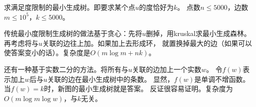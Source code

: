 \begin{prob}
	求满足度限制的最小生成树。即要求某个点$u$的度恰好为$k$。
	点数$n \le 5000$，边数$m \le 10^5$，$k \le 5000$。
\end{prob}

\begin{sol}
	传统最小度限制生成树的做法基于贪心：先将$u$删掉，用kruskal求最小生成森林。
	再考虑将与$u$关联的边往上加。如果加上去形成环，
	就置换掉最大的边（如果可以使答案变小的话）。复杂度是$O(m\log m + nk)$。
	\par 还有一种基于实数二分的方法。将所有与$u$关联的边加上一个实数$w$。
	令$f(w)$表示加上$w$后与$u$关联的边在最小生成树中的条数。
	显然，$f(w)$是单调不增函数。当$f(w) = k$时，新图的最小生成树就是答案。
	反证很容易证明。复杂度为$O(m \log m \log w)$，与$k$无关。
\end{sol}
